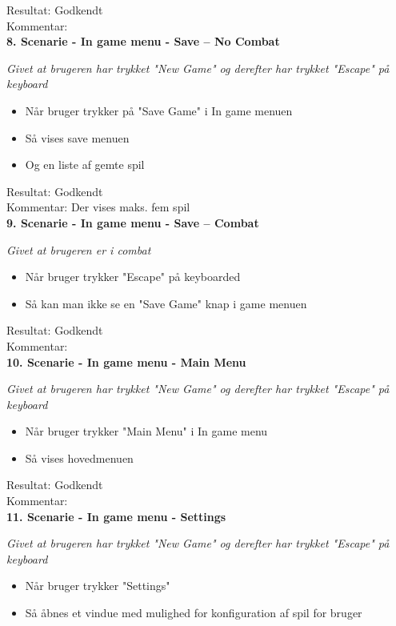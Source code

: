 Resultat: Godkendt\\
Kommentar:\\

\textbf{8. Scenarie - In game menu - Save -- No Combat}

\textit{Givet at brugeren har trykket "New Game" og derefter har trykket "Escape" på keyboard}

\begin{itemize}
  \item Når bruger trykker på "Save Game" i In game menuen
  \item Så vises save menuen
  \item Og en liste af gemte spil
\end{itemize}

Resultat: Godkendt\\
Kommentar: Der vises maks. fem spil\\

\textbf{9. Scenarie - In game menu - Save -- Combat}

\textit{Givet at brugeren er i combat}

\begin{itemize}
  \item Når bruger trykker "Escape" på keyboarded
  \item Så kan man ikke se en "Save Game" knap i game menuen
\end{itemize}

Resultat: Godkendt\\
Kommentar:\\

\textbf{10. Scenarie - In game menu - Main Menu}

\textit{Givet at brugeren har trykket "New Game" og derefter har trykket "Escape" på keyboard}

\begin{itemize}
  \item Når bruger trykker "Main Menu" i In game menu
  \item Så vises hovedmenuen
\end{itemize}

Resultat: Godkendt\\
Kommentar:\\

\textbf{11. Scenarie - In game menu - Settings}

\textit{Givet at brugeren har trykket "New Game" og derefter har trykket "Escape" på keyboard}

\begin{itemize}
  \item Når bruger trykker "Settings"
  \item Så åbnes et vindue med mulighed for konfiguration af spil for bruger
\end{itemize}

